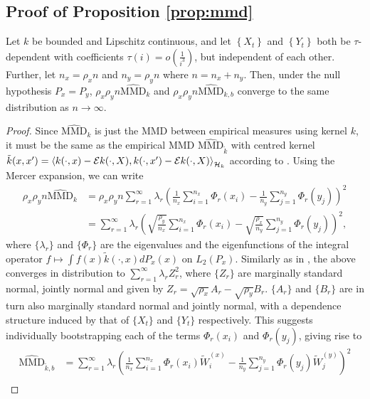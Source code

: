   \subsection{Proof of Proposition \ref{prop:mmd} }
  \begin{proposition}
 Let $k$ be bounded and Lipschitz continuous, and let $\left\{ X_t \right\}$ and $\left\{ Y_t \right\}$ 
 both be $\tau$-dependent with coefficients $\tau(i) = o(\frac{1}{i^3})$, but independent of each other. Further, let $n_x=\rho_x n$ and $n_y=\rho_y n$ where $n=n_x+n_y$. Then, under the null hypothesis $P_x=P_y$, $\rho_x \rho_y n\widehat{\text{MMD}}_k$ and $\rho_x \rho_y n\widehat{\text{MMD}}_{k,b}$ converge to the same distribution as $n\to\infty$.
\end{proposition}
  \begin{proof}
  Since $\widehat{\text{MMD}}_k$ is just the MMD between empirical measures
using kernel $k$, it must be the same as the empirical MMD $\widehat{\text{MMD}}_{\tilde k}$ with centred kernel $\tilde{k}(x,x')=\left \langle k(\cdot,x)-\mathcal{E} k(\cdot,X), k(\cdot,x')-\mathcal{E} k(\cdot,X) \right \rangle_{\mathcal{H}_k}$ according to \cite[Theorem 22]{SejSriGreFuk13}. Using the Mercer expansion, we can write
\begin{align*}
\rho_x \rho_y n\widehat{\text{MMD}}_k & = \rho_{x}\rho_{y}n\sum_{r=1}^{\infty}\lambda_{r}\left(\frac{1}{n_{x}}\sum_{i=1}^{n_{x}}\Phi_{r}(x_{i})-\frac{1}{n_{y}}\sum_{j=1}^{n_{y}}\Phi_{r}(y_{j})\right)^{2}\\
 & = \sum_{r=1}^{\infty}\lambda_{r}\left(\sqrt{\frac{\rho_{y}}{n_{x}}}\sum_{i=1}^{n_{x}}\Phi_{r}(x_{i})-\sqrt{\frac{\rho_{x}}{n_{y}}}\sum_{j=1}^{n_{y}}\Phi_{r}(y_{j})\right)^{2},
\end{align*}
where $\{\lambda_r\}$ and $\{\Phi_r\}$ are the eigenvalues and the eigenfunctions of the integral operator $f\mapsto \int f(x)\tilde k(\cdot,x)dP_x(x)$ on $L_2(P_x)$. Similarly as in \cite[Theorem 2.1]{leucht_dependent_2013}, the above converges in distribution to $\sum_{r=1}^\infty \lambda_r Z_r^2$, where $\{Z_r\}$ are marginally standard normal, jointly normal and given by $Z_r=\sqrt{\rho_x}A_r-\sqrt{\rho_y}B_r$. $\{A_r\}$ and $\{B_r\}$ are in turn also marginally standard normal and jointly normal, with a dependence structure induced by that of $\{X_t\}$ and $\{Y_t\}$ respectively. This suggests individually bootstrapping each of the terms $\Phi_{r}(x_{i})$ and $\Phi_{r}(y_{j})$, giving rise to 
\begin{align*}
\widehat{\text{MMD}}_{\tilde k, b}&=\sum_{r=1}^{\infty}\lambda_{r}\left(\frac{1}{n_{x}}\sum_{i=1}^{n_{x}}\Phi_{r}(x_{i})\tilde W_i^{(x)}-\frac{1}{n_{y}}\sum_{j=1}^{n_{y}}\Phi_{r}(y_{j})\tilde W_j^{(y)}\right)^{2}\\

\end{align*}
\end{proof}
